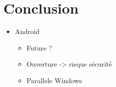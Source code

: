 \chapter*{Conclusion}

\begin{itemize}
\item Android
  \begin{itemize}
  \item Future ?
  \item Ouverture -> risque sécurité
  \item Parallele Windows
  \end{itemize}

\end{itemize}